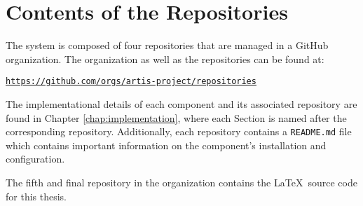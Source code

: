 \appendix

\chapter{Contents of the Repositories}
The system is composed of four repositories that are managed in a GitHub organization. The organization as well as the repositories can be found at:
\begin{center}
    \texttt{\href{https://github.com/orgs/artis-project/repositories}{https://github.com/orgs/artis-project/repositories}}
\end{center}

The implementational details of each component and its associated repository are found in Chapter \ref{chap:implementation}, where each Section is named after the corresponding repository. Additionally, each repository contains a \texttt{README.md} file which contains important information on the component's installation and configuration.

The fifth and final repository in the organization contains the \LaTeX \  source code for this thesis.
